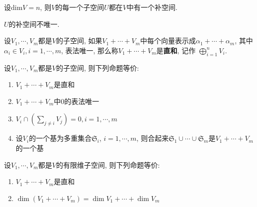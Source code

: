 \begin{Proposition}
设$\text{dim}V = n$, 则$V$的每一个子空间$U$都在$V$中有一个补空间.
\end{Proposition}

\begin{Remark}
$U$的补空间不唯一.
\end{Remark}

\begin{Definition}
设$V_1, \cdots, V_m$都是$V$的子空间, 如果$V_1 + \cdots + V_m$中每个向量表示成$\alpha_1 + \cdots + \alpha_m$, 其中$\alpha_i \in V_i, i = 1, \cdots, m$,
表法唯一, 那么称$V_1 + \cdots + V_m$是\textbf{直和}, 记作
$ %
\bigoplus_{i=1}^n V_i
$.
\end{Definition}

\begin{Theorem}
设$V_1, \cdots, V_m$都是$V$的子空间, 则下列命题等价:
\begin{enumerate}[(1)]
\item $V_1 + \cdots + V_m$是直和
\item $V_1 + \cdots + V_m$中$0$的表法唯一
\item $\displaystyle V_i \cap (\sum_{j \neq i} V_j) = 0, i = 1, \cdots, m$ %
\item 设$V_i$的一个基为多重集合$\mathfrak{S}_i$, $i = 1, \cdots, m$, 则合起来$\mathfrak{S}_1 \cup \cdots \cup \mathfrak{S}_m$是$V_1 + \cdots + V_m$的一个基
\end{enumerate}
\end{Theorem}

\begin{Theorem}
设$V_1, \cdots, V_m$都是$V$的有限维子空间, 则下列命题等价:
\begin{enumerate}[(1)]
\item $V_1 + \cdots + V_m$是直和
\item $\dim {(V_1 + \cdots + V_m)} = \dim V_1 + \cdots + \dim V_m$
\end{enumerate}
\end{Theorem}
